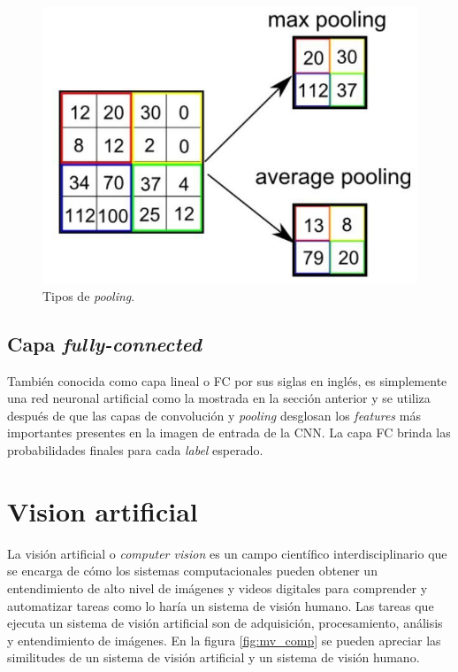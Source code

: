 \begin{figure}[h]
	\centering
	\includegraphics[scale=0.3]{./Figures/cnn_pool.png}
	\caption{Tipos de \textit{pooling}\protect\footnotemark.}
	\label{fig:cnn_pool}
\end{figure}

\subsection{Capa \textit{fully-connected}}
También conocida como capa lineal o FC por sus siglas en inglés, es simplemente una red neuronal artificial como la mostrada en la sección anterior y se utiliza después de que las capas de convolución y \textit{pooling} desglosan los \textit{features} más importantes presentes en la imagen de entrada de la CNN. La capa FC brinda las probabilidades finales para cada \textit{label} esperado.

\section{Vision artificial}
La visión artificial o \textit{computer vision} es un campo científico interdisciplinario que se encarga de cómo los sistemas computacionales pueden obtener un entendimiento de alto nivel de imágenes y videos digitales para comprender y automatizar tareas como lo haría un sistema de visión humano. Las tareas que ejecuta un sistema de visión artificial son de adquisición, procesamiento, análisis y entendimiento de imágenes. En la figura \ref{fig:mv_comp} se pueden apreciar las similitudes de un sistema de visión artificial y un sistema de visión humano.

